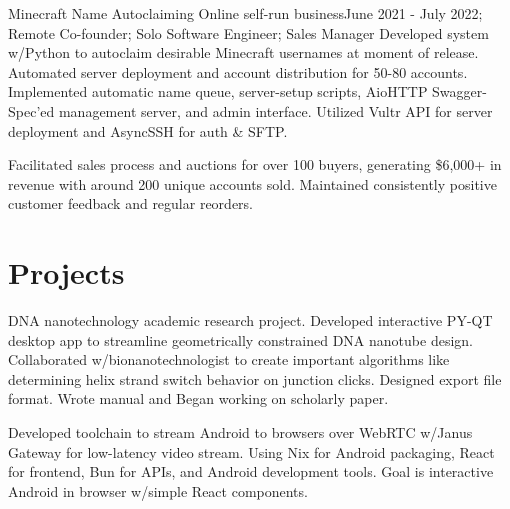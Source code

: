 \documentclass[letterpaper, 10pt]{article}
\begin{document}
\resumeSubheading
{Minecraft Name Autoclaiming }{Online self-run business}{June 2021 - July 2022; Remote}
{Co-founder; Solo Software Engineer; Sales Manager}{}{}
\resumeItemListStart
{}
{Developed system w/Python to autoclaim desirable Minecraft usernames at moment of release. Automated server deployment and account distribution for 50-80 accounts. Implemented automatic name queue, server-setup scripts, AioHTTP Swagger-Spec'ed management server, and admin interface. Utilized Vultr API for server deployment and AsyncSSH for auth \& SFTP.}

{Facilitated sales process and auctions for over 100 buyers, generating \$6,000+ in revenue with around 200 unique accounts sold. Maintained consistently positive customer feedback and regular reorders.}
\resumeItemListEnd

\resumeSubHeadingListEnd

\vspace{-16pt}

\section{Projects}
\resumeSubHeadingListStart
{}
{DNA nanotechnology academic research project. Developed interactive PY-QT desktop app to streamline geometrically constrained DNA nanotube design. Collaborated w/bionanotechnologist to create important algorithms like determining helix strand switch behavior on junction clicks. Designed export file format. Wrote manual and Began working on scholarly paper.}


{Developed toolchain to stream Android to browsers over WebRTC w/Janus Gateway for low-latency video stream. Using Nix for Android packaging, React for frontend, Bun for APIs, and Android development tools. Goal is interactive Android in browser w/simple React components.}
\end{document}
